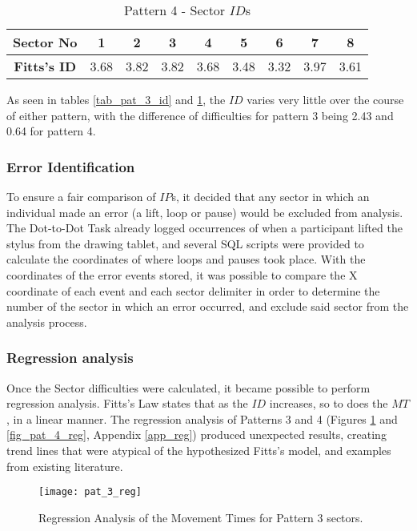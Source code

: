 			\begin{table}[h]
				\centering
				\caption{Pattern 4 - Sector \(ID\)s}
				\label{tab_pat_4_id}
				\begin{tabular}{|c|c|c|c|c|c|c|c|c|}
					\hline
					\textbf{Sector No}  & 1    & 2    & 3    & 4    & 5    & 6    & 7    & 8    \\ \hline
					\textbf{Fitts's ID} & 3.68 & 3.82 & 3.82 & 3.68 & 3.48 & 3.32 & 3.97 & 3.61 \\ \hline
				\end{tabular}
			\end{table}
						
			As seen in tables \ref{tab_pat_3_id} and \ref{tab_pat_4_id}, the \(ID\) varies very little over the course of either pattern, with the difference of difficulties for pattern 3 being 2.43 and 0.64 for pattern 4.
			
		\subsubsection{Error Identification}
			To ensure a fair comparison of \(IP\)s, it decided that any sector in which an individual made an error (a lift, loop or pause) would be excluded from analysis. The Dot-to-Dot Task already logged occurrences of when a participant lifted the stylus from the drawing tablet, and several SQL scripts were provided to calculate the coordinates of where loops and pauses took place. With the coordinates of the error events stored, it was possible to compare the X coordinate of each event and each sector delimiter in order to determine the number of the sector in which an error occurred, and exclude said sector from the analysis process. 
			
		\subsubsection{Regression analysis}
			Once the Sector difficulties were calculated, it became possible to perform regression analysis. Fitts’s Law states that as the \(ID\) increases, so to does the \(MT\), in a linear manner.  The regression analysis of Patterns 3 and 4 (Figures \ref{fig_pat_3_reg} and \ref{fig_pat_4_reg}, Appendix \ref{app_reg}) produced unexpected results, creating trend lines that were atypical of the hypothesized Fitts’s model, and examples from existing literature.
			
			\begin{figure}[h]
				\centering
				\texttt{[image: pat\_3\_reg]}
				\caption{Regression Analysis of the Movement Times for Pattern 3 sectors.}
				\label{fig_pat_3_reg}
			\end{figure}
			
